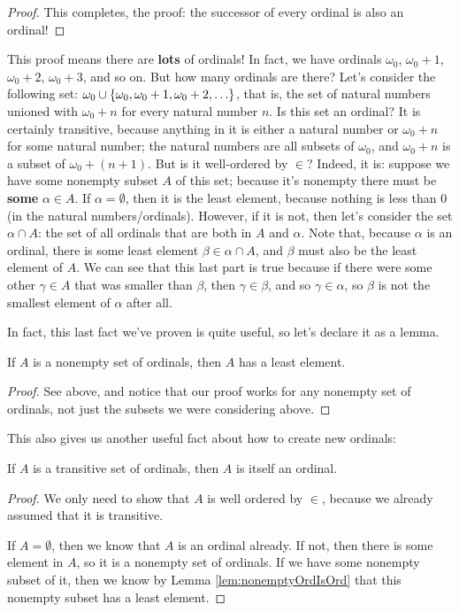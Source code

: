 \begin{proof}
    This completes, the proof: the successor of every ordinal is also an ordinal!
\end{proof}

This proof means there are \textbf{lots} of ordinals!
In fact, we have ordinals $\omega_0$, $\omega_0 + 1$, $\omega_0 + 2$, $\omega_0 + 3$, and so on.
But how many ordinals are there?
Let's consider the following set: $\omega_0 \cup {\left\{ {\omega_0, \omega_0 + 1, \omega_0 + 2, \ldots} \right\}}$, that is, the set of natural numbers unioned with $\omega_0 + n$ for every natural number $n$.
Is this set an ordinal?
It is certainly transitive, because anything in it is either a natural number or $\omega_0 + n$ for some natural number; the natural numbers are all subsets of $\omega_0$, and $\omega_0 + n$ is a subset of $\omega_0 + (n + 1)$.
But is it well-ordered by $\in$?
Indeed, it is: suppose we have some nonempty subset $A$ of this set; because it's nonempty there must be \textbf{some} $\alpha \in A$.
If $\alpha = \emptyset$, then it is the least element, because nothing is less than $0$ (in the natural numbers/ordinals).
However, if it is not, then let's consider the set $\alpha \cap A$: the set of all ordinals that are both in $A$ and $\alpha$.
Note that, because $\alpha$ is an ordinal, there is some least element $\beta \in \alpha \cap A$, and $\beta$ must also be the least element of $A$.
We can see that this last part is true because if there were some other $\gamma \in A$ that was smaller than $\beta$, then $\gamma \in \beta$, and so $\gamma \in \alpha$, so $\beta$ is not the smallest element of $\alpha$ after all.

In fact, this last fact we've proven is quite useful, so let's declare it as a lemma.

\begin{lemma}\label{lem:nonemptyOrdIsOrd}
    If $A$ is a nonempty set of ordinals, then $A$ has a least element.
\end{lemma}
\begin{proof}
    See above, and notice that our proof works for any nonempty set of ordinals, not just the subsets we were considering above.
\end{proof}

This also gives us another useful fact about how to create new ordinals:
\begin{lemma}\label{lem:transSetOfOrdIsOrd}
    If $A$ is a transitive set of ordinals, then $A$ is itself an ordinal.
\end{lemma}
\begin{proof}
    We only need to show that $A$ is well ordered by $\in$, because we already assumed that it is transitive.

    If $A = \emptyset$, then we know that $A$ is an ordinal already.
    If not, then there is some element in $A$, so it is a nonempty set of ordinals.
    If we have some nonempty subset of it, then we know by Lemma \ref{lem:nonemptyOrdIsOrd} that this nonempty subset has a least element.
\end{proof}

